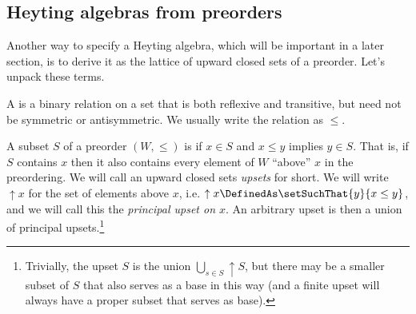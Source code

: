 



\subsection{Heyting algebras from preorders}

Another way to specify a Heyting algebra, which will be important in a later section, is to derive it as the lattice of upward closed sets of a preorder.  Let's unpack these terms.

A  is a binary relation on a set that is both reflexive and transitive, but need not be symmetric or antisymmetric.  We usually write the relation as $\leq$.

A subset $S$ of a preorder $(W, \leq)$ is  
if $x \in S$ and $x \leq y$ implies $y \in S$.  That is, if $S$ contains $x$ then it also contains every element of $W$ ``above'' $x$ in the preordering.  We will call an upward closed sets \emph{upsets} for short.  We will write $\uparrow x$ for the set of elements above $x$, i.e. $\uparrow x \DefinedAs \setSuchThat{y}{x \leq y}$, and we will call this the \emph{principal upset on $x$}.  An arbitrary upset is then a union of principal upsets.\footnote{
Trivially, the upset $S$ is the union $\bigcup_{s \in S} \uparrow S$, but there may be a smaller subset of $S$ that also serves as a base in this way (and a finite upset will always have a proper subset that serves as base).
}

